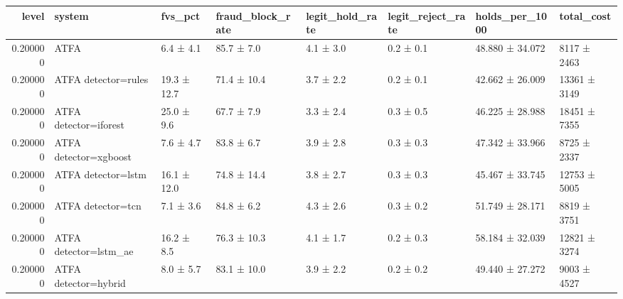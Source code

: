 \begin{tabular}{rlllllll}
\toprule
level & system & fvs\_pct & fraud\_block\_rate & legit\_hold\_rate & legit\_reject\_rate & holds\_per\_1000 & total\_cost \\
\midrule
0.200000 & ATFA & 6.4 ± 4.1 & 85.7 ± 7.0 & 4.1 ± 3.0 & 0.2 ± 0.1 & 48.880 ± 34.072 & 8117 ± 2463 \\
0.200000 & ATFA detector=rules & 19.3 ± 12.7 & 71.4 ± 10.4 & 3.7 ± 2.2 & 0.2 ± 0.1 & 42.662 ± 26.009 & 13361 ± 3149 \\
0.200000 & ATFA detector=iforest & 25.0 ± 9.6 & 67.7 ± 7.9 & 3.3 ± 2.4 & 0.3 ± 0.5 & 46.225 ± 28.988 & 18451 ± 7355 \\
0.200000 & ATFA detector=xgboost & 7.6 ± 4.7 & 83.8 ± 6.7 & 3.9 ± 2.8 & 0.3 ± 0.3 & 47.342 ± 33.966 & 8725 ± 2337 \\
0.200000 & ATFA detector=lstm & 16.1 ± 12.0 & 74.8 ± 14.4 & 3.8 ± 2.7 & 0.3 ± 0.3 & 45.467 ± 33.745 & 12753 ± 5005 \\
0.200000 & ATFA detector=tcn & 7.1 ± 3.6 & 84.8 ± 6.2 & 4.3 ± 2.6 & 0.3 ± 0.2 & 51.749 ± 28.171 & 8819 ± 3751 \\
0.200000 & ATFA detector=lstm\_ae & 16.2 ± 8.5 & 76.3 ± 10.3 & 4.1 ± 1.7 & 0.2 ± 0.3 & 58.184 ± 32.039 & 12821 ± 3274 \\
0.200000 & ATFA detector=hybrid & 8.0 ± 5.7 & 83.1 ± 10.0 & 3.9 ± 2.2 & 0.2 ± 0.2 & 49.440 ± 27.272 & 9003 ± 4527 \\
\bottomrule
\end{tabular}
